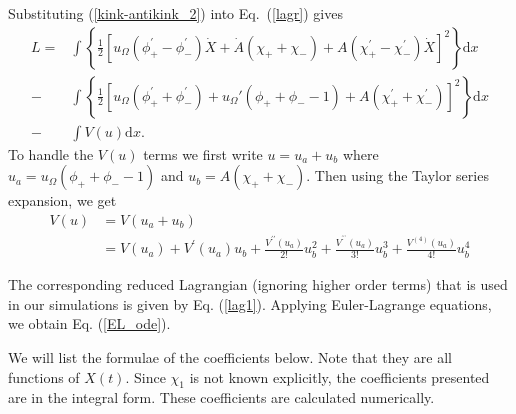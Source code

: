 \documentclass[vecphys]{svmult}		%
\begin{document}
{Substituting (\ref{kink-antikink_2}) into Eq.~(\ref{lagr}) gives 
\begin{equation}
\begin{aligned}
 L=&\int  \left\{\frac{1}{2}\left[ u_{\Omega}\left( \phi _{+}^{\prime
}-\phi _{-}^{\prime }\right) \dot{X}  +\dot{A}(\chi_{+}+\chi_{-})+A(\chi_{+}^{\prime }-\chi_{-}^{\prime
})\dot{X}
 \right]^{2} \right\}\mathrm{d}x\\
 -&\int  \left\{\frac{1}{2}\left[ u_{\Omega}\left( \phi _{+}^{\prime
}+\phi _{-}^{\prime }\right)   +u_{\Omega}'(\phi _+ + \phi_{-} -1) +A(\chi_{+} ^{\prime }+\chi_{-}^{\prime })
\right]^{2} \right\}\mathrm{d}x\\
-&\int V(u) \mathrm{d}x.
\label{Lagrangian_expanded}
\end{aligned}
\end{equation}
To handle the $V(u)$ terms we first write $u =u _{a}+u _{b}$ where $u
_{a}=u_{\Omega}(\phi _+ + \phi_{-} -1)
$ and $u _{b}= A(\chi_{+}+\chi_{-})$. Then using the Taylor series expansion, we get
\begin{equation}
\begin{aligned}
V(u )&= V(u _{a}+u _{b})\\
&=V(u _{a})+V^{\prime }(u
_{a})u _{b}+\frac{V^{\prime \prime }(u _{a})}{2!}u _{b}^{2}+\frac{V^{^{\prime \prime \prime }}(u _{a})}{3!}u _{b}^{3}+\frac{V^{(4)}(u
	_{a})}{4!}u _{b}^{4} 
\label{eq:taylor_V}
\end{aligned}
\end{equation}

The corresponding reduced Lagrangian (ignoring higher order terms) that is used in our simulations is given by Eq. (\ref{lag1}). Applying Euler-Lagrange equations, we obtain Eq. (\ref{EL_ode}). 


We will list the formulae of the coefficients below. Note that they are all functions of $X(t)$. Since $\chi_{1}$ is not known explicitly, the coefficients presented are in the integral form. These coefficients are calculated numerically.

}
\end{document}
